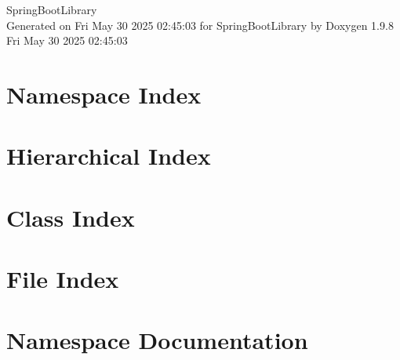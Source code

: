 \documentclass[twoside]{book}
\newcommand{\+}{\discretionary{\mbox{\scriptsize$\hookleftarrow$}}{}{}}
\newcommand{\clearemptydoublepage}{%
    \newpage{\pagestyle{empty}\cleardoublepage}%
  }
\begin{document}
  \raggedbottom
    \hypersetup{pageanchor=false,
                bookmarksnumbered=true,
                pdfencoding=unicode
               }
  \begin{titlepage}
  \vspace*{7cm}
  \begin{center}%
  {\Large Spring\+Boot\+Library}\\
  \vspace*{1cm}
  {\large Generated on Fri May 30 2025 02\+:45\+:03 for Spring\+Boot\+Library by Doxygen 1.9.8}\\
    \vspace*{0.5cm}
    {\small Fri May 30 2025 02:45:03}
  \end{center}
  \end{titlepage}
  \clearemptydoublepage
  \tableofcontents
  \clearemptydoublepage
  \hypersetup{pageanchor=true}

\chapter{Namespace Index}

\chapter{Hierarchical Index}

\chapter{Class Index}

\chapter{File Index}

\chapter{Namespace Documentation}









\end{document}
